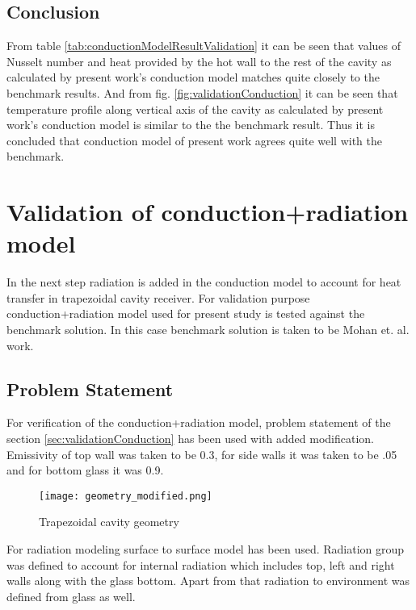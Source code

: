 \subsection{Conclusion}

From table \ref{tab:conductionModelResultValidation} it can be seen that values of Nusselt number and heat provided by the hot wall to the rest of the cavity as calculated by present work's conduction model matches quite closely to the benchmark results. And from fig. \ref{fig:validationConduction} it can be seen that temperature profile along vertical axis of the cavity as calculated by present work's conduction model is similar to the the benchmark result. Thus it is concluded that conduction model of present work agrees quite well with the benchmark.


\section{Validation of conduction+radiation model}
In the next step radiation is added in the conduction model to account for heat transfer in trapezoidal cavity receiver. For validation purpose conduction+radiation model used for present study is tested against the benchmark solution. In this case benchmark solution is taken to be Mohan et. al.\citep{MOHAN201837} work.
\subsection{Problem Statement}
For verification of the conduction+radiation model, problem statement of the section \ref{sec:validationConduction} has been used with added modification. Emissivity of top wall was taken to be 0.3, for side walls it was taken to be .05 and for bottom glass it was 0.9. 
\begin{figure}[H]
\begin{center}
\texttt{[image: geometry\_modified.png]}
\caption{Trapezoidal cavity geometry}
\label{geometry_modified}
\end{center}
\end{figure}

For radiation modeling surface to surface model has been used. Radiation group was defined to account for internal radiation which includes top, left and right walls along with the glass bottom. Apart from that radiation to environment was defined from glass as well.
